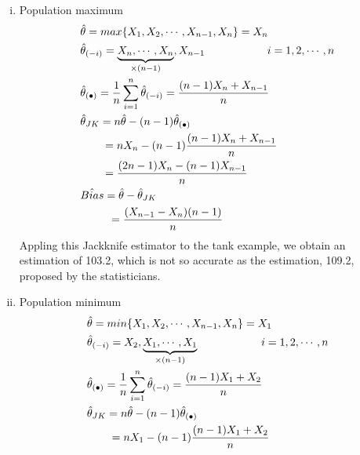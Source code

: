 \documentclass[12pt,fleqn]{article}\usepackage[]{graphicx}\usepackage[]{color}
\theoremstyle{definition}
\begin{document}
\begin{enumerate}[1.]
\begin{enumerate}[(a)]
            \begin{enumerate}[i.]
              \item Population maximum\\
              \vspace{-0.8cm}
  			        \begin{align*}
  			          &\hat{\theta} = max\{X_1, X_2, \cdots, X_{n-1}, X_n\} = X_n\\
  			          &\hat{\theta}_{(-i)} = \underbrace{X_n, \cdots, X_n}_{\times (n-1)},X_{n-1} \hspace{2cm}i = 1,2,\cdots,n\\
  			          &\hat{\theta}_{(\bullet)} = \frac{1}{n}\sum_{i=1}^{n}\hat{\theta}_{(-i)} = \frac{(n-1)X_n+X_{n-1}}{n}\\
  			          &\hat{\theta}_{JK} = n\hat{\theta} - (n-1)\hat{\theta}_{(\bullet)}\\
  			          &\hspace{0.7cm}    = n X_n - (n-1)\frac{(n-1)X_n+X_{n-1}}{n}\\
  			          &\hspace{0.7cm}    = \frac{(2n-1)X_n-(n-1)X_{n-1}}{n}\\
  			          &\hat{Bias} = \hat{\theta} - \hat{\theta}_{JK}\\
  			          &\hspace{0.9cm}  = \frac{(X_{n-1}-X_{n})(n-1)}{n}
  			        \end{align*}
              Appling this Jackknife estimator to the tank example, we obtain an estimation of 103.2, which is not so accurate as the estimation, 109.2, proposed by the statisticians.\\
  			      \item Population minimum\\
              \vspace{-0.8cm}
  			        \begin{align*}
  			          &\hat{\theta} = min\{X_1, X_2, \cdots, X_{n-1}, X_n\} = X_1\\
  			          &\hat{\theta}_{(-i)} = X_{2},\underbrace{X_1, \cdots, X_1}_{\times (n-1)} \hspace{2cm}i = 1,2,\cdots,n\\
  			          &\hat{\theta}_{(\bullet)} = \frac{1}{n}\sum_{i=1}^{n}\hat{\theta}_{(-i)} = \frac{(n-1)X_1+X_{2}}{n}\\
  			          &\hat{\theta}_{JK} = n\hat{\theta} - (n-1)\hat{\theta}_{(\bullet)}\\
  			          &\hspace{0.7cm}    = n X_1 - (n-1)\frac{(n-1)X_1+X_{2}}{n}\\

\end{align*}
\end{enumerate}
\end{enumerate}
\end{enumerate}
\end{document}
